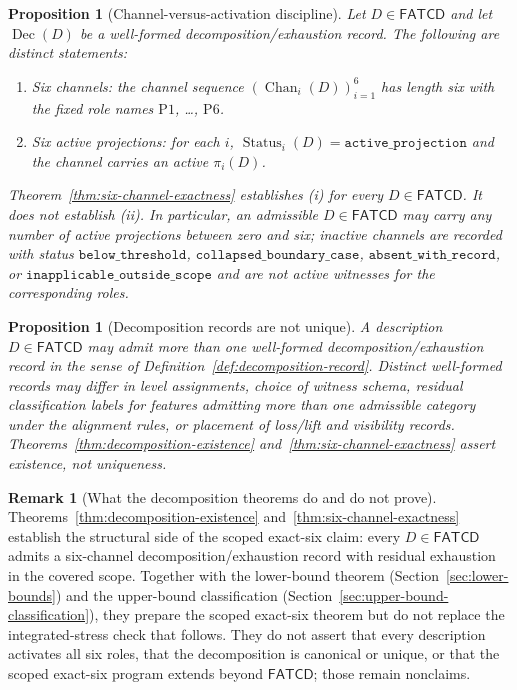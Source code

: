 \documentclass[11pt]{article}
\newtheorem{proposition}[theorem]{Proposition}
\theoremstyle{definition}
\newtheorem{remark}[theorem]{Remark}
\newcommand{\FATCD}{\ensuremath{\mathsf{FATCD}}}
\newcommand{\Dec}[1]{\ensuremath{\operatorname{Dec}\!\left(#1\right)}}
\newcommand{\Chan}[2]{\ensuremath{\operatorname{Chan}_{#1}\!\left(#2\right)}}
\newcommand{\Status}[2]{\ensuremath{\operatorname{Status}_{#1}\!\left(#2\right)}}
\newcommand{\activeproj}{\texttt{active\_projection}}
\newcommand{\belowthr}{\texttt{below\_threshold}}
\newcommand{\collapsedbc}{\texttt{collapsed\_boundary\_case}}
\newcommand{\absentrec}{\texttt{absent\_with\_record}}
\newcommand{\outsidescope}{\texttt{inapplicable\_outside\_scope}}
\newcommand{\Pone}{\ensuremath{\mathrm{P1}}}
\newcommand{\Psix}{\ensuremath{\mathrm{P6}}}
\begin{document}
\begin{proposition}[Channel-versus-activation discipline]\label{prop:channel-vs-activation}
Let \(D \in \FATCD{}\) and let \(\Dec{D}\) be a well-formed decomposition/exhaustion
record. The following are distinct statements:
\begin{enumerate}[label=(\roman*),topsep=2pt,itemsep=1pt]
  \item \emph{Six channels}: the channel sequence
    \((\Chan{i}{D})_{i=1}^{6}\) has length six with the fixed role names
    \Pone{}, \ldots, \Psix{}.
  \item \emph{Six active projections}: for each \(i\),
    \(\Status{i}{D} = \activeproj\) and the channel carries an active
    \(\pi_i(D)\).
\end{enumerate}
Theorem~\ref{thm:six-channel-exactness} establishes (i) for every
\(D \in \FATCD{}\). It does not establish (ii). In particular, an
admissible \(D \in \FATCD{}\) may carry any number of active projections
between zero and six; inactive channels are recorded with status
\(\belowthr\), \(\collapsedbc\), \(\absentrec\), or \(\outsidescope\)
and are not active witnesses for the corresponding roles.
\end{proposition}

\begin{proposition}[Decomposition records are not unique]\label{prop:non-uniqueness}
A description \(D \in \FATCD{}\) may admit more than one well-formed
decomposition/exhaustion record in the sense of
Definition~\ref{def:decomposition-record}. Distinct well-formed records
may differ in level assignments, choice of witness schema, residual
classification labels for features admitting more than one admissible
category under the alignment rules, or placement of loss/lift and
visibility records. Theorems~\ref{thm:decomposition-existence}
and~\ref{thm:six-channel-exactness} assert existence, not uniqueness.
\end{proposition}

\begin{remark}[What the decomposition theorems do and do not prove]\label{rem:dec-scope}
Theorems~\ref{thm:decomposition-existence}
and~\ref{thm:six-channel-exactness} establish the structural side of
the scoped exact-six claim: every \(D \in \FATCD{}\) admits a
six-channel decomposition/exhaustion record with residual exhaustion
in the covered scope. Together with the lower-bound theorem
(Section~\ref{sec:lower-bounds}) and the upper-bound classification
(Section~\ref{sec:upper-bound-classification}), they prepare the
scoped exact-six theorem but do not replace the integrated-stress
check that follows. They do not assert that every description
activates all six roles, that the decomposition is canonical or
unique, or that the scoped exact-six program extends beyond \FATCD{};
those remain nonclaims.
\end{remark}
\end{document}
